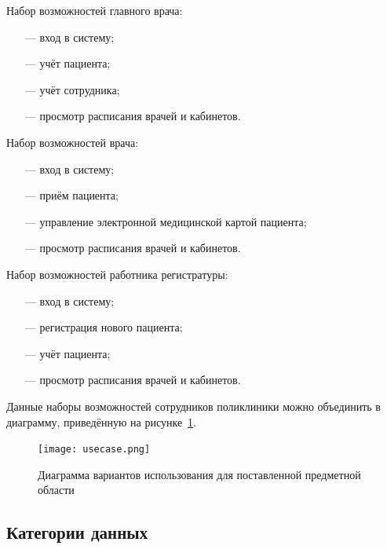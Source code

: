 Набор возможностей главного врача:
\begin{itemize}[leftmargin=1.6\parindent]
	\item[---] вход в систему;
	\item[---] учёт пациента;
	\item[---] учёт сотрудника;
	\item[---] просмотр расписания врачей и кабинетов.
\end{itemize}

Набор возможностей врача:
\begin{itemize}[leftmargin=1.6\parindent]
	\item[---] вход в систему;
	\item[---] приём пациента;
	\item[---] управление электронной медицинской картой пациента;
	\item[---] просмотр расписания врачей и кабинетов.
\end{itemize}

Набор возможностей работника регистратуры:
\begin{itemize}[leftmargin=1.6\parindent]
	\item[---] вход в систему;
	\item[---] регистрация нового пациента;
	\item[---] учёт пациента;
	\item[---] просмотр расписания врачей и кабинетов.
\end{itemize}

Данные наборы возможностей сотрудников поликлиники можно объединить в диаграмму, приведённую на рисунке~\ref{fig:usecase}.

\begin{figure}[h!]
	\centering
	\captionsetup{justification=centering}
	\texttt{[image: usecase.png]}
	\caption{Диаграмма вариантов использования для поставленной предметной области}
	\label{fig:usecase}
\end{figure}


%

\subsection{Категории данных}

